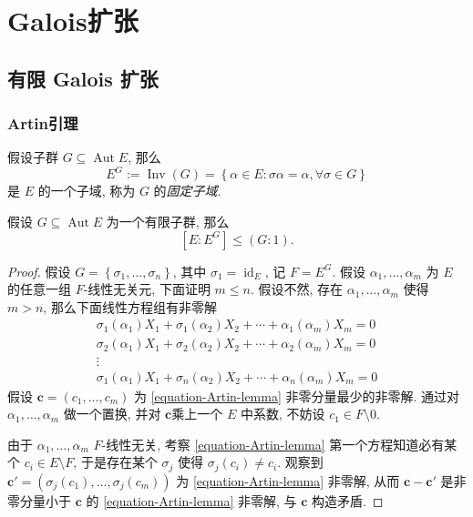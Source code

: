 \chapter{Galois扩张}

\section{有限 Galois 扩张}

\subsection{Artin引理}

假设子群 \( G \subseteq \operatorname{Aut} E \), 那么
\[
  E^G := \operatorname{Inv}(G) = \left\lbrace \alpha \in E: \sigma \alpha =
  \alpha, \forall \sigma \in G \right\rbrace
\]
是 \( E \) 的一个子域, 称为 \( G \) 的\emph{固定子域}.

\begin{lemma}[Artin]
  \label{lemma-Artin}
  假设 \( G \subseteq \operatorname{Aut} E \) 为一个有限子群, 那么
  \[
    [E: E^G] \leq (G: 1).
  \]
\end{lemma}
\begin{proof}
  假设 \( G = \left\lbrace \sigma_1, \ldots, \sigma_n \right\rbrace \), 其中 \(
  \sigma_1 = \operatorname{id}_E \), 记 \( F = E^G \).
  假设 \( \alpha_1, \ldots, \alpha_m \) 为 \( E \) 的任意一组 \( F
  \)-线性无关元, 下面证明 \( m \leq n \).
  假设不然, 存在 \( \alpha_1, \ldots, \alpha_m \) 使得 \( m > n \),
  那么下面线性方程组有非零解
  \begin{equation}
    \begin{gathered}
      \sigma_1(\alpha_1)X_1 + \sigma_1(\alpha_2) X_2 + \cdots + \alpha_1
      (\alpha_m) X_m = 0\\
      \sigma_2(\alpha_1)X_1 + \sigma_2(\alpha_2) X_2 + \cdots + \alpha_2
      (\alpha_m) X_m = 0\\
      \vdots\\
      \sigma_1(\alpha_1)X_1 + \sigma_n(\alpha_2) X_2 + \cdots + \alpha_n
      (\alpha_m) X_m = 0
    \end{gathered}
    \label{equation-Artin-lemma}
  \end{equation}
  假设 \( \mathbf{c} = (c_1, \ldots, c_m) \) 为 \eqref{equation-Artin-lemma}
  非零分量最少的非零解.
  通过对 \( \alpha_1, \ldots, \alpha_m \) 做一个置换, 并对 \( \mathbf{c}
  \)乘上一个 \( E \) 中系数, 不妨设 \( c_1 \in F \setminus 0\).

  由于 \( \alpha_1, \ldots, \alpha_m \) \( F \)-线性无关, 考察
  \eqref{equation-Artin-lemma} 第一个方程知道必有某个 \( c_i \in E \setminus F
  \), 于是存在某个 \( \sigma_j \) 使得 \( \sigma_j(c_i) \neq c_i \).
  观察到 \( \mathbf{c}' =  (\sigma_j(c_1),\ldots, \sigma_j(c_m)) \) 为
  \eqref{equation-Artin-lemma} 非零解, 从而 \( \mathbf{c} - \mathbf{c}' \)
  是非零分量小于 \( \mathbf{c} \) 的 \eqref{equation-Artin-lemma} 非零解, 与 \(
  \mathbf{c} \) 构造矛盾.
\end{proof}

